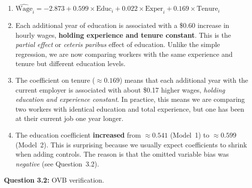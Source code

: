 \documentclass[11pt,letterpaper]{article}
\begin{document}
\begin{answer}
\begin{enumerate}[label=(\alph*)]
\item $\widehat{\text{Wage}}_i = -2.873 + 0.599 \times \text{Educ}_i + 0.022 \times \text{Exper}_i + 0.169 \times \text{Tenure}_i$

\item Each additional year of education is associated with a \$0.60 increase in hourly wages, \textbf{holding experience and tenure constant}. This is the \textit{partial effect} or \textit{ceteris paribus} effect of education. Unlike the simple regression, we are now comparing workers with the same experience and tenure but different education levels.

\item The coefficient on tenure ($\approx 0.169$) means that each additional year with the current employer is associated with about \$0.17 higher wages, \textit{holding education and experience constant}. In practice, this means we are comparing two workers with identical education and total experience, but one has been at their current job one year longer.

\item The education coefficient \textbf{increased} from $\approx 0.541$ (Model~1) to $\approx 0.599$ (Model~2). This is surprising because we usually expect coefficients to shrink when adding controls. The reason is that the omitted variable bias was \textit{negative} (see Question~3.2).
\end{enumerate}
\end{answer}

\textbf{Question 3.2:} OVB verification.
\end{document}
